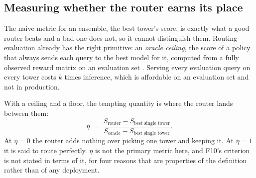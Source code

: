 \documentclass[11pt]{article}
\begin{document}
\subsection{Measuring whether the router earns its place}
\label{sec:routereval}

The naive metric for an ensemble, the best tower's score, is exactly what a good router beats and a bad one does not, so it cannot distinguish them. Routing evaluation already has the right primitive: an \emph{oracle ceiling}, the score of a policy that always sends each query to the best model for it, computed from a fully observed reward matrix on an evaluation set \cite{banditrouting2025,routingsurvey2026}. Serving every evaluation query on every tower costs $k$ times inference, which is affordable on an evaluation set and not in production.

With a ceiling and a floor, the tempting quantity is where the router lands between them:
\begin{equation}
\eta \;=\; \frac{S_{\text{router}} - S_{\text{best single tower}}}{S_{\text{oracle}} - S_{\text{best single tower}}} .
\label{eq:routereff}
\end{equation}
At $\eta = 0$ the router adds nothing over picking one tower and keeping it. At $\eta = 1$ it is said to route perfectly. $\eta$ is not the primary metric here, and F10's criterion is not stated in terms of it, for four reasons that are properties of the definition rather than of any deployment.
\end{document}
